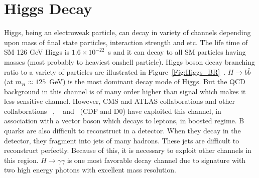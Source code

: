 \section{Higgs Decay}
Higgs, being an electroweak particle, can decay in variety of channels depending upon mass of final state particles, interaction strength and etc. 
The life time of SM 126 GeV Higgs is $1.6\times10^{-22}$~s and it can decay to all SM particles having masses (most probably to heaviest onshell particle). 
Higgs boson decay branching ratio to a variety of particles are illustrated in Figure~\ref{Fig:Higgs_BR}~\cite{Referenceb}. $H\rightarrow b\bar{b}$ (at $m_H \approx 125$~GeV) is the most dominant decay mode of Higgs. But the QCD background in this channel is of
many order higher than signal which makes it less sensitive channel. 
However, CMS and ATLAS collaborations and other collaborations ~\cite{Reference13}, ~\cite{Reference14} and ~\cite{Reference15}(CDF and D0) have exploited this channel, in association with a vector boson which decays to leptons, in boosted regime. B quarks are also difficult to reconstruct in a detector. When they decay in the detector, they fragment into jets of many hadrons. These jets are difficult to  
reconstruct perfectly. Because of this, it is necessary to exploit other channels in this region. $H \rightarrow \gamma\gamma$ is one most favorable decay channel due 
to signature with two high energy photons with excellent mass resolution. 


